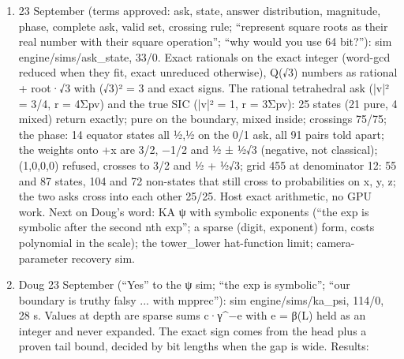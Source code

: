 \begin{enumerate}
\item 23 September (terms approved: ask, state, answer distribution, magnitude, phase, complete ask, valid set, crossing rule; “represent square roots as their real number with their square operation”; “why would you use 64 bit?”): sim engine/sims/ask\_\allowbreak{}state, 33/0. Exact rationals on the exact integer (word-gcd reduced when they fit, exact unreduced otherwise), Q(√3) numbers as rational + root·√3 with (√3)² = 3 and exact signs. The rational tetrahedral ask (|v|² = 3/4, r = 4Σpv) and the true SIC (|v|² = 1, r = 3Σpv): 25 states (21 pure, 4 mixed) return exactly; pure on the boundary, mixed inside; crossings 75/75; the phase: 14 equator states all ½,½ on the 0/1 ask, all 91 pairs told apart; the weights onto +x are 3/2, −1/2 and ½ ± ½√3 (negative, not classical); (1,0,0,0) refused, crosses to 3/2 and ½ + ½√3; grid 455 at denominator 12: 55 and 87 states, 104 and 72 non-states that still cross to probabilities on x, y, z; the two asks cross into each other 25/25. Host exact arithmetic, no GPU work. Next on Doug's word: KA ψ with symbolic exponents (“the exp is symbolic after the second nth exp”; a sparse (digit, exponent) form, costs polynomial in the scale); the tower\_\allowbreak{}lower hat-function limit; camera-parameter recovery sim.
\item Doug 23 September (“Yes” to the ψ sim; “the exp is symbolic”; “our boundary is truthy falsy ... with mpprec”): sim engine/sims/ka\_\allowbreak{}psi, 114/0, 28 s. Values at depth are sparse sums c·γ\textasciicircum{}−e with e = β(L) held as an integer and never expanded. The exact sign comes from the head plus a proven tail bound, decided by bit lengths when the gap is wide. Results:


\end{enumerate}
